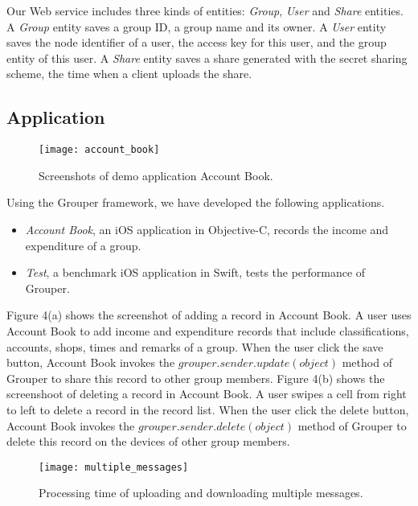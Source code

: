 Our Web service includes three kinds of entities: \emph{Group}, \emph{User} and \emph{Share} entities. 
A \emph{Group} entity saves a group ID, a group name and its owner. 
A \emph{User} entity saves the node identifier of a user, the access key for this user, and the group entity of this user. 
A \emph{Share} entity saves a share generated with the secret sharing scheme, the time when a client uploads the share. 

\subsection{Application}

\begin{figure}[t]
	\centering
	\texttt{[image: account\_book]}
	\caption{Screenshots of demo application Account Book.}
\end{figure}

Using the Grouper framework, we have developed the following applications. 

\begin{itemize}
	\setlength{\itemsep}{1pt}
	\setlength{\parskip}{0pt}
	\setlength{\parsep}{0pt}
	\item \emph{Account Book}, an iOS application in Objective-C, records the income and expenditure of a group.
	\item \emph{Test}, a benchmark iOS application in Swift, tests the performance of Grouper.
\end{itemize}

Figure 4(a) shows the screenshot of adding a record in Account Book. 
A user uses Account Book to add income and expenditure records that include classifications, accounts, shops, times and remarks of a group. 
When the user click the save button, Account Book invokes the $grouper.sender.update(object)$ method of Grouper to share this record to other group members.
Figure 4(b) shows the screenshoot of deleting a record in Account Book. 
A user swipes a cell from right to left to delete a record in the record list. 
When the user click the delete button, Account Book invokes the $grouper.sender.delete(object)$ method of Grouper to delete this record on the devices of other group members.

\begin{figure*}[t]
	\centering
	\texttt{[image: multiple\_messages]}
	\caption{Processing time of uploading and downloading multiple messages.}
\end{figure*}

